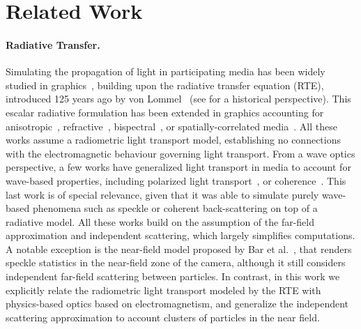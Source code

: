 \section{Related Work}
\label{sec:prior}
%
\paragraph{Radiative Transfer. } 
Simulating the propagation of light in participating media has been widely studied in graphics~\cite{novak2018monte}, building upon the radiative transfer equation (RTE), introduced 125 years ago by von Lommel~ (see \cite{mishchenko2013125} for a historical perspective). 
%
This escalar radiative formulation has been extended in graphics accounting for anisotropic~\cite{jakob2010radiative}, refractive~\cite{ament2014refractive}, bispectral~\cite{gutierrez2008visualizing}, or spatially-correlated media~\cite{jarabo2018radiative,bitterli2018radiative}. All these works assume a radiometric light transport model, establishing no connections with the electromagnetic behaviour governing light transport. 
%
From a wave optics perspective, a few works have generalized light transport in media to account for wave-based properties, including polarized light transport~\cite{wilkie2001combined,Jarabo2018bidirectional}, or coherence~\cite{bar2019monte}. This last work is of special relevance, given that it was able to simulate purely wave-based phenomena such as speckle or coherent back-scattering on top of a radiative model. 
%
All these works build on the assumption of the far-field approximation and independent scattering, which largely simplifies computations. A notable exception is the near-field model proposed by Bar et al.~, that renders speckle statistics in the near-field zone of the camera, although it still considers independent far-field scattering between particles. In contrast, in this work we explicitly relate the radiometric light transport modeled by the RTE with physics-based optics based on electromagnetism, and generalize the independent scattering approximation to account clusters of particles in the near field. 


